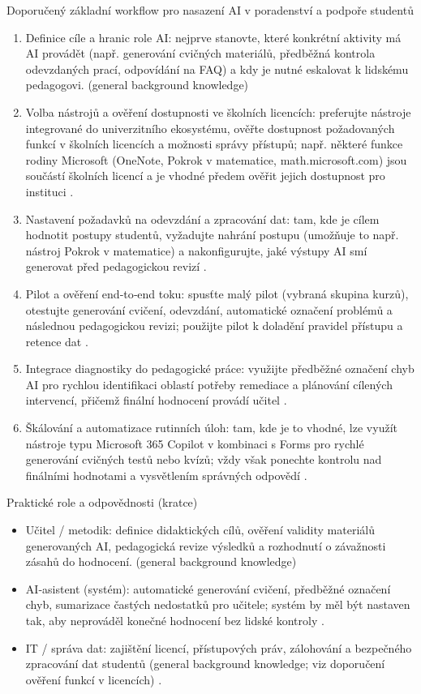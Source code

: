 \documentclass{report}%
\begin{document}
Doporučený základní workflow pro nasazení AI v poradenství a podpoře studentů
\begin{enumerate}
  \item Definice cíle a hranic role AI: nejprve stanovte, které konkrétní aktivity má AI provádět (např. generování cvičných materiálů, předběžná kontrola odevzdaných prací, odpovídání na FAQ) a kdy je nutné eskalovat k lidskému pedagogovi. (general background knowledge)
  \item Volba nástrojů a ověření dostupnosti ve školních licencích: preferujte nástroje integrované do univerzitního ekosystému, ověřte dostupnost požadovaných funkcí v školních licencích a možnosti správy přístupů; např. některé funkce rodiny Microsoft (OneNote, Pokrok v matematice, math.microsoft.com) jsou součástí školních licencí a je vhodné předem ověřit jejich dostupnost pro instituci \cite{kb_ai_101_tipu_pdf_04e4a115_page_8_1}. 
  \item Nastavení požadavků na odevzdání a zpracování dat: tam, kde je cílem hodnotit postupy studentů, vyžadujte nahrání postupu (umožňuje to např. nástroj Pokrok v matematice) a nakonfigurujte, jaké výstupy AI smí generovat před pedagogickou revizí \cite{kb_ai_101_tipu_pdf_04e4a115_page_8_1}.
  \item Pilot a ověření end‑to‑end toku: spusťte malý pilot (vybraná skupina kurzů), otestujte generování cvičení, odevzdání, automatické označení problémů a následnou pedagogickou revizi; použijte pilot k doladění pravidel přístupu a retence dat \cite{kb_ai_101_tipu_pdf_04e4a115_page_8_1}.
  \item Integrace diagnostiky do pedagogické práce: využijte předběžné označení chyb AI pro rychlou identifikaci oblastí potřeby remediace a plánování cílených intervencí, přičemž finální hodnocení provádí učitel \cite{kb_ai_101_tipu_pdf_04e4a115_page_8_1}.
  \item Škálování a automatizace rutinních úloh: tam, kde je to vhodné, lze využít nástroje typu Microsoft 365 Copilot v kombinaci s Forms pro rychlé generování cvičných testů nebo kvízů; vždy však ponechte kontrolu nad finálními hodnotami a vysvětlením správných odpovědí \cite{kb_ai_101_tipu_pdf_04e4a115_page_36_1}.
\end{enumerate}

Praktické role a odpovědnosti (kratce)
\begin{itemize}
  \item Učitel / metodik: definice didaktických cílů, ověření validity materiálů generovaných AI, pedagogická revize výsledků a rozhodnutí o závažnosti zásahů do hodnocení. (general background knowledge)
  \item AI‑asistent (systém): automatické generování cvičení, předběžné označení chyb, sumarizace častých nedostatků pro učitele; systém by měl být nastaven tak, aby neprováděl konečné hodnocení bez lidské kontroly \cite{kb_ai_101_tipu_pdf_04e4a115_page_8_1}.
  \item IT / správa dat: zajištění licencí, přístupových práv, zálohování a bezpečného zpracování dat studentů (general background knowledge; viz doporučení ověření funkcí v licencích) \cite{kb_ai_101_tipu_pdf_04e4a115_page_8_1}.
\end{itemize}
\end{document}
